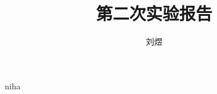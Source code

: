 \documentclass[a4paper,12pt]{article}
\title{第二次实验报告}
\author{刘煜}
\begin{document}
    \maketitle
    niha
\end{document}
